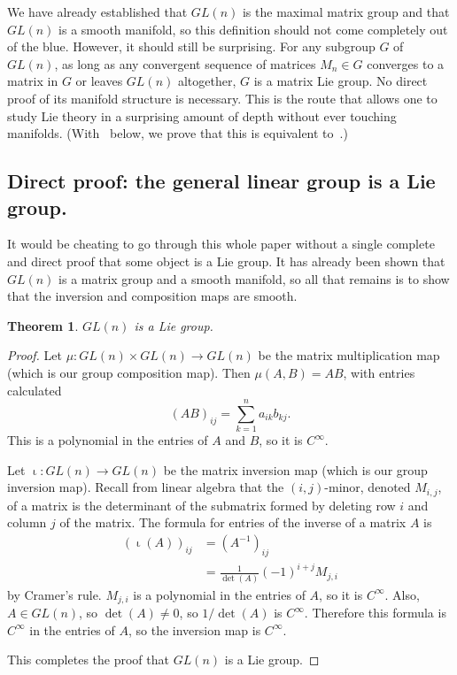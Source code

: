 \documentclass[12pt]{article}
\newtheorem{them}{Theorem}[section]
\theoremstyle{definition}
\theoremstyle{definition}
\theoremstyle{definition}
\theoremstyle{definition}
\theoremstyle{definition}
\theoremstyle{definition}
\theoremstyle{definition}
\theoremstyle{definition}
\begin{document}
\par{We have already established
that $GL(n)$ is the maximal matrix group and that
$GL(n)$ is a smooth manifold, so this definition should
not come completely out of the blue. However, it
should still be surprising. For any subgroup $G$ of
$GL(n)$, as long as any convergent sequence of
matrices $M_n \in G$ converges to a matrix in $G$
or leaves $GL(n)$ altogether, $G$ is a matrix Lie
group. No direct proof of its manifold structure
is necessary. This is the route that allows one to
study Lie theory in a surprising amount of depth
without ever touching manifolds. (With~
below, we prove that this is equivalent to~.)}

\subsection{Direct proof: the general linear group is a Lie group.}

\par{It would be cheating to go through this whole
paper without a single complete and direct proof
that some object is a Lie group. It has already
been shown that $GL(n)$ is a matrix group and a
smooth manifold, so all that remains is to show
that the inversion and composition maps are
smooth.}

\begin{them}
$GL(n)$ is a Lie group.
\end{them}
\begin{proof}
\par{Let $\mu : GL(n) \times GL(n) \to GL(n)$ be
the matrix multiplication map (which is our group
composition map).
Then $\mu(A, B) = AB$, with entries calculated 
\[
{(AB)}_{ij} = \sum_{k=1}^n a_{ik}b_{kj}.
\] 
This is a polynomial in the entries of $A$ and
$B$, so it is $C^\infty$.}

\par{Let $\upiota: GL(n) \to GL(n)$ be the matrix
inversion map (which is our group inversion map). Recall
from linear algebra that the $(i,j)$-minor,
denoted $M_{i,j}$, of a matrix is the determinant
of the submatrix formed by deleting row $i$ and
column $j$ of the matrix. The formula for entries
of the inverse of a matrix $A$ is 
\[
\begin{aligned}
    {(\upiota(A))}_{ij} & = {(A^{-1})}_{ij} \\ 
    & = \frac{1}{\det(A)}{(-1)}^{i+j}M_{j,i}
\end{aligned}
\] 
by Cramer’s rule. $M_{j,i}$ is a polynomial in the
entries of $A$, so it is $C^\infty$. Also, $A \in
GL(n)$, so $\det(A) \neq 0$, so $1/ \det(A)$ is
$C^\infty$. Therefore this formula is $C^\infty$
in the entries of $A$, so the inversion map is
$C^\infty$.}

\par{This completes the proof that $GL(n)$ is a Lie group.}
\end{proof}
\end{document}
